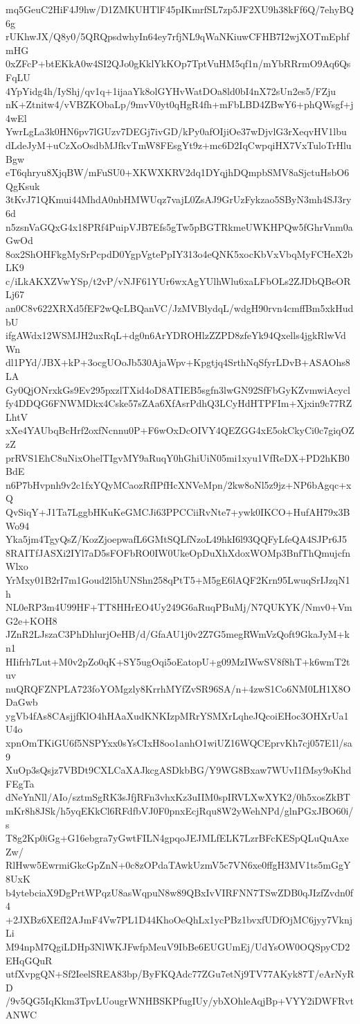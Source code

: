 mq5GeuC2HiF4J9hw/D1ZMKUHTlF45pIKmrfSL7zp5JF2XU9h38kFf6Q/7ehyBQ6g
rUKhwJX/Q8y0/5QRQpsdwhyIn64ey7rfjNL9qWaNKiuwCFHB7I2wjXOTmEphfmHG
0xZFcP+btEKkA0w4SI2QJo0gKklYkKOp7TptVuHM5qf1n/mYbRRrmO9Aq6QsFqLU
4YpYidg4h/IyShj/qv1q+1ijaaYk8olGYHvWatDOa8ld0bI4nX72sUn2es5/FZju
nK+Ztnitw4/vVBZKObaLp/9mvV0yt0qHgR4fh+mFbLBD4ZBwY6+phQWsgf+j4wEl
YwrLgLa3k0HN6pv7lGUzv7DEGj7ivGD/kPy0afOIjiOe37wDjvlG3rXeqvHV1lbu
dLdeJyM+uCzXoOsdbMJfkvTmW8FEsgYt9z+mc6D2IqCwpqiHX7VxTuloTrHluBgw
eT6qhryu8XjqBW/mFuSU0+XKWXKRV2dq1DYqjhDQmpbSMV8aSjctuHsbO6QgKsuk
3tKvJ71QKmui44MhdA0nbHMWUqz7vajL0ZsAJ9GrUzFykzao5SByN3mh4SJ3ry6d
n5zsnVaGQxG4x18PRf4PuipVJB7Efs5gTw5pBGTRkmeUWKHPQw5fGhrVnm0aGwOd
8ox2ShOHFkgMySrPcpdD0YgpVgtePpIY313o4eQNK5xocKbVxVbqMyFCHeX2bLK9
c/iLkAKXZVwYSp/t2vP/vNJF61YUr6wxAgYUlhWlu6xaLFbOLs2ZJDbQBeORLj67
an0C8v622XRXd5fEF2wQcLBQanVC/JzMVBlydqL/wdgH90rvn4cmffBm5xkHudbU
ifgAWdx12WSMJH2uxRqL+dg0n6ArYDROHlzZZPD8zfeYk94Qxells4jgkRlwVdWn
dl1PYd/JBX+kP+3ocgUOoJb530AjaWpv+Kpgtjq4SrthNqSfyrLDvB+ASAOhs8LA
Gy0QjONrxkGs9Ev295pxzlTXid4oD8ATIEB5sgfn3lwGN92SfFbGyKZvmwiAcycl
fy4DDQG6FNWMDkx4Cske57sZAa6XfAsrPdhQ3LCyHdHTPFIm+Xjxin9c77RZLhtV
xXe4YAUbqBcHrf2oxfNcnnu0P+F6wOxDcOIVY4QEZGG4xE5okCkyCi0c7giqOZzZ
prRVS1EhC8uNixOhelTIgvMY9aRuqY0hGhiUiN05mi1xyu1VfReDX+PD2hKB0BdE
n6P7bHvpnh9v2c1fxYQyMCaozRfIPfHcXNVeMpn/2kw8oNl5z9jz+NP6bAgqc+xQ
QvSiqY+J1Ta7LggbHKuKeGMCJi63PPCCiiRvNte7+ywk0IKCO+HufAH79x3BWo94
Yka5jm4TgyQsZ/KozZjoepwafL6GMtSQLfNzoL49hkI6l93QQFyLfeQA4SJPr6J5
8RAITfJASXi2IYl7aD5sFOFbRO0IW0UkeOpDuXhXdoxWOMp3BnfThQmujcfnWlxo
YrMxy01B2rI7m1Goud2l5hUNShn258qPtT5+M5gE6lAQF2Krn95LwuqSrIJzqN1h
NL0eRP3m4U99HF+TT8HHrEO4Uy249G6aRuqPBuMj/N7QUKYK/Nmv0+VmG2e+KOH8
JZnR2LJszaC3PhDhlurjOeHB/d/GfaAU1j0v2Z7G5megRWmVzQoft9GkaJyM+kn1
HIifrh7Lut+M0v2pZo0qK+SY5ugOqi5oEatopU+g09MzIWwSV8f8hT+k6wmT2tuv
nuQRQFZNPLA723foYOMgzly8KrrhMYfZvSR96SA/n+4zwS1Co6NM0LH1X8ODaGwb
ygVb4fAs8CAsjjfKlO4hHAaXudKNKIzpMRrYSMXrLqheJQcoiEHoc3OHXrUa1U4o
xpnOmTKiGU6f5NSPYxx0sYsCIxH8oo1anhO1wiUZ16WQCEprvKh7cj057E1l/sa9
XuOp3sQsjz7VBDt9CXLCaXAJkcgASDkbBG/Y9WG8Bxaw7WUvI1fMsy9oKhdFEgTa
dNeYnNll/AIo/sztmSgRK3sJfjRFn3vhxKz3uIIM0spIRVLXwXYK2/0h5xosZkBT
mKr8h8JSk/h5yqEKkCl6RFdfbVJ0F0pnxEcjRqu8W2yWehNPd/glnPGxJBO60i/s
T8g2Kp0iGg+G16ebgra7yGwtFILN4gpqoJEJMLfELK7LzrBFcKESpQLuQuAxeZw/
RlHww5EwrmiGkcGpZnN+0c8zOPdaTAwkUzmV5c7VN6xe0ffgH3MV1ts5mGgY8UxK
b4ytebciaX9DgPrtWPqzU8asWqpuN8w89QBxIvVIRFNN7TSwZDB0qJIzfZvdn0f4
+2JXBz6XEfI2AJmF4Vw7PL1D44KhoOeQhLx1ycPBz1bvxfUDfOjMC6jyy7VknjLi
M94npM7QgiLDHp3NlWKJFwfpMeuV9IbBe6EUGUmEj/UdYsOW0OQSpyCD2EHqGQuR
utfXvpgQN+Sf2IeelSREA83bp/ByFKQAdc77ZGu7etNj9TV77AKyk87T/eArNyRD
/9v5QG5IqKkm3TpvLUougrWNHBSKPfugIUy/ybXOhleAqjBp+VYY2iDWFRvtANWC
